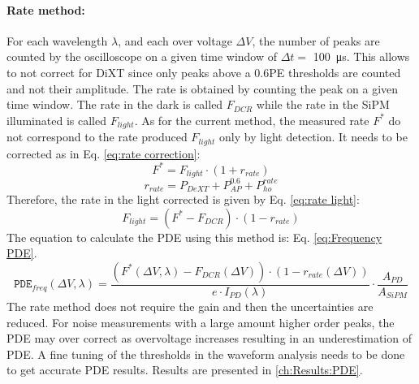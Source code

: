 \paragraph{Rate method:} For each wavelength $\lambda$, and each over voltage $\Delta V$, the number of peaks are counted by the oscilloscope on a given time window of $\Delta t =$ \SI{100}{\micro s}. This allows to not correct for DiXT since only peaks above a $0.6$PE thresholds are counted and not their amplitude. The rate is obtained by counting the peak on a given time window. The rate in the dark is called $F_{DCR}$ while the rate in the SiPM illuminated is called $F_{light}$. 
As for the current method, the measured rate $F^*$ do not correspond to the rate produced $F_{light}$ only by light detection. It needs to be corrected as in Eq. \eqref{eq:rate correction}:
\begin{equation}
    F^{*} = F_{light}\cdot(1+ r_{rate})
    \label{eq:rate correction}
\end{equation}
\begin{equation*}
    r_{rate} = P_{DeXT} + P_{AP}^{0.6} +P_{ho}^{rate}
    \label{eq: correction r current}  
\end{equation*}
Therefore, the rate in the light corrected is given by Eq. \eqref{eq:rate light}:
\begin{equation}
    F_{light}= (F^* - F_{DCR})\cdot(1-r_{rate})
    \label{eq:rate light}
\end{equation}
The equation to calculate the PDE using this method is: Eq. \eqref{eq:Frequency PDE}. 
\begin{equation}
    \texttt{PDE}_{freq}(\Delta V, \lambda) = \frac{\left(F^{*}(\Delta V, \lambda)-F_{DCR}(\Delta V)\right)\cdot(1-r_{rate}(\Delta V))}{e \cdot I_{PD}(\lambda)}\cdot \frac{A_{PD}}{A_{SiPM}}
    \label{eq:Frequency PDE}
\end{equation}
The rate method does not require the gain and then the uncertainties are reduced. For noise measurements with a large amount higher order peaks, the PDE may over correct as overvoltage increases resulting in an underestimation of PDE. A fine tuning of the thresholds in the waveform analysis needs to be done to get accurate PDE results. 
Results are presented in \ref{ch:Results:PDE}.
